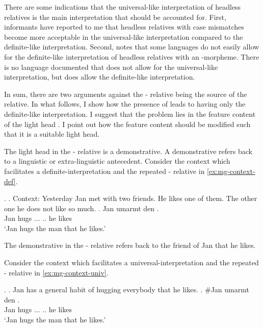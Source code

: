 There are some indications that the universal-like interpretation of headless relatives is the main interpretation that should be accounted for.
First, informants have reported to me that headless relatives with case mismatches become more acceptable in the universal-like interpretation compared to the definite-like interpretation.
Second,  notes that some languages do not easily allow for the definite-like interpretation of headless relatives with an -morpheme. There is no language documented that does not allow for the universal-like interpretation, but does allow the definite-like interpretation.

In sum, there are two arguments against the - relative being the source of the  relative. In what follows, I show how the presence of  leads to having only the definite-like interpretation. I suggest that the problem lies in the feature content of the light head . I point out how the feature content should be modified such that it is a suitable light head.

The light head in the - relative is a demonstrative. A demonstrative refers back to a linguistic or extra-linguistic antecedent. Consider the context which facilitates a definite-interpretation and the repeated - relative in \ref{ex:mg-context-def}.

\ex.
\a. Context: Yesterday Jan met with two friends. He likes one of them. The other one he does not like so much.\label{ex:mg-context-def}
\bg. Jan umarmt den   .\\
Jan hugs ... .. he likes\\
`Jan hugs the man that he likes.'


The demonstrative  in the - relative refers back to the friend of Jan that he likes.

Consider the context which facilitates a universal-interpretation and the repeated - relative in \ref{ex:mg-context-univ}.

\ex.
\a. Jan has a general habit of hugging everybody that he likes.\label{ex:mg-context-univ}
\bg. \#Jan umarmt den   .\\
Jan hugs ... .. he likes\\
`Jan hugs the man that he likes.'

